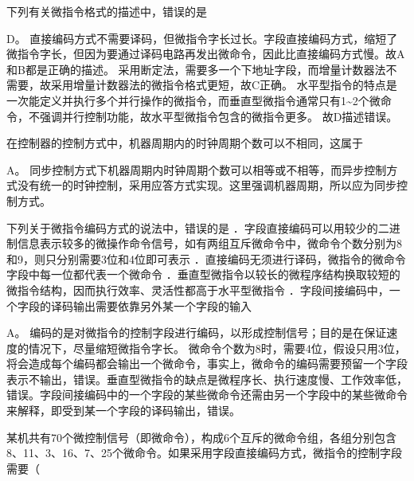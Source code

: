 \question 下列有关微指令格式的描述中，错误的是
\par{}
\begin{solution}D。
直接编码方式不需要译码，但微指令字长过长。字段直接编码方式，缩短了微指令字长，但因为要通过译码电路再发出微命令，因此比直接编码方式慢。故A和B都是正确的描述。
采用断定法，需要多一个下地址字段，而增量计数器法不需要，故采用增量计数器法的微指令格式更短，故C正确。
水平型指令的特点是一次能定义并执行多个并行操作的微指令，而垂直型微指令通常只有1\textasciitilde{}2个微命令，不强调并行控制功能，故水平型微指令包含的微指令更多。
故D描述错误。
\end{solution}
\question 在控制器的控制方式中，机器周期内的时钟周期个数可以不相同，这属于
\par{}
\begin{solution}A。
同步控制方式下机器周期内时钟周期个数可以相等或不相等，而异步控制方式没有统一的时钟控制，采用应答方式实现。这里强调机器周期，所以应为同步控制方式。
\end{solution}
\question 下列关于微指令编码方式的说法中，错误的是
．字段直接编码可以用较少的二进制信息表示较多的微操作命令信号，如有两组互斥微命令中，微命令个数分别为8和9，则只分别需要3位和4位即可表示
．直接编码无须进行译码，微指令的微命令字段中每一位都代表一个微命令
．垂直型微指令以较长的微程序结构换取较短的微指令结构，因而执行效率、灵活性都高于水平型微指令
．字段间接编码中，一个字段的译码输出需要依靠另外某一个字段的输入
\par{}
\begin{solution}A。
编码的是对微指令的控制字段进行编码，以形成控制信号；目的是在保证速度的情况下，尽量缩短微指令字长。
微命令个数为8时，需要4位，假设只用3位，将会造成每个编码都会输出一个微命令，事实上，微命令的编码需要预留一个字段表示不输出，错误。垂直型微指令的缺点是微程序长、执行速度慢、工作效率低，错误。字段间接编码中的一个字段的某些微命令还需由另一个字段中的某些微命令来解释，即受到某一个字段的译码输出，错误。
\end{solution}
\question 某机共有70个微控制信号（即微命令），构成6个互斥的微命令组，各组分别包含8、11、3、16、7、25个微命令。如果采用字段直接编码方式，微指令的控制字段需要（
